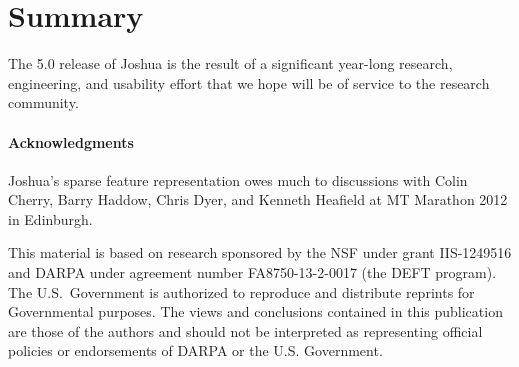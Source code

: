 \documentclass[11pt]{article}
\begin{document}
\section{Summary}

The 5.0 release of Joshua is the result of a significant year-long
research, engineering, and usability effort that we hope will be of
service to the research community. 

\paragraph{Acknowledgments}

Joshua's sparse feature representation owes much to discussions with
Colin Cherry, Barry Haddow, Chris Dyer, and Kenneth Heafield at MT
Marathon 2012 in Edinburgh.

This material is based on research sponsored by the NSF under grant
IIS-1249516 and DARPA under agreement number FA8750-13-2-0017 (the
DEFT program).  The U.S.\ Government is authorized to reproduce and
distribute reprints for Governmental purposes.  The views and
conclusions contained in this publication are those of the authors and
should not be interpreted as representing official policies or
endorsements of DARPA or the U.S. Government.





\end{document}
